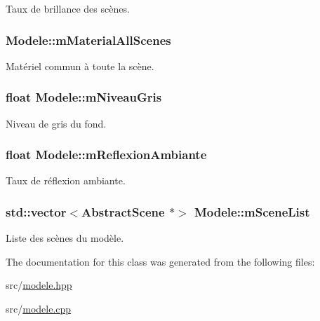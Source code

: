 Taux de brillance des scènes. 

\hypertarget{class_modele_af5f2f7153778090d3bcefc6db83a89e4}{
\subsubsection[{m\+Material\+All\+Scenes}]{ Modele\+::m\+Material\+All\+Scenes}}\label{class_modele_af5f2f7153778090d3bcefc6db83a89e4}


Matériel commun à toute la scène. 

\hypertarget{class_modele_a3ab26b711a9452193a341479b3294464}{
\subsubsection[{m\+Niveau\+Gris}]{\setlength{\rightskip}{0pt plus 5cm}float Modele\+::m\+Niveau\+Gris}}\label{class_modele_a3ab26b711a9452193a341479b3294464}


Niveau de gris du fond. 

\hypertarget{class_modele_ab60784b5eb94976da411711a10046d1d}{
\subsubsection[{m\+Reflexion\+Ambiante}]{\setlength{\rightskip}{0pt plus 5cm}float Modele\+::m\+Reflexion\+Ambiante}}\label{class_modele_ab60784b5eb94976da411711a10046d1d}


Taux de réflexion ambiante. 

\hypertarget{class_modele_a5b1fde589f17e1f6a87c00022ae2821e}{
\subsubsection[{m\+Scene\+List}]{\setlength{\rightskip}{0pt plus 5cm}std\+::vector$<${\bf Abstract\+Scene} $\ast$$>$ Modele\+::m\+Scene\+List}}\label{class_modele_a5b1fde589f17e1f6a87c00022ae2821e}


Liste des scènes du modèle. 



The documentation for this class was generated from the following files\+:\begin{DoxyCompactItemize}
\item 
src/\hyperlink{modele_8hpp}{modele.\+hpp}\item 
src/\hyperlink{modele_8cpp}{modele.\+cpp}\end{DoxyCompactItemize}
